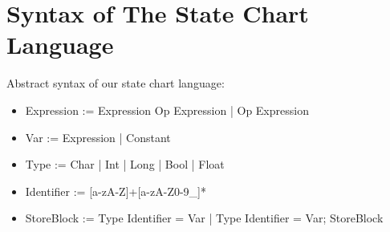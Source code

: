 \section{Syntax of The State Chart Language}

Abstract syntax of our state chart language:

\begin{itemize}
	\item Expression := Expression Op Expression | Op Expression
	\item Var := Expression | Constant
	\item Type := Char | Int | Long | Bool | Float
	\item Identifier := [a-zA-Z]+[a-zA-Z0-9_]*  
	
	\item StoreBlock := Type Identifier = Var | Type Identifier = Var; StoreBlock
	
\end{itemize}